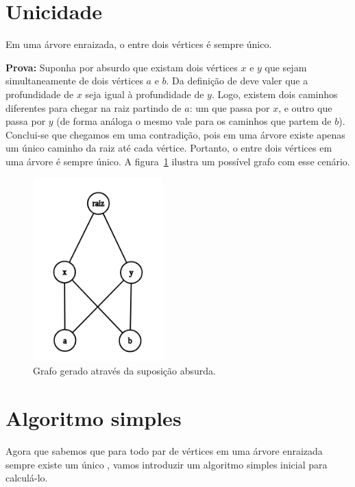 \section{Unicidade}

\begin{definition}
\label{unicidade}
Em uma árvore enraizada, o \LCA entre dois vértices é sempre único.
\end{definition}

\noindent
\textbf{Prova: }
Suponha por absurdo que existam dois vértices $x$ e $y$ que sejam simultaneamente \LCA de dois vértices $a$ e $b$. Da definição de \LCA deve valer que a profundidade de $x$ seja igual à profundidade de $y$. Logo, existem dois caminhos diferentes para chegar na raiz partindo de $a$: um que passa por $x$, e outro que passa por $y$ (de forma análoga o mesmo vale para os caminhos que partem de $b$). Conclui-se que chegamos em uma contradição, pois em uma árvore existe apenas um único caminho da raiz até cada vértice. Portanto, o \LCA entre dois vértices em uma árvore é sempre único. A figura~\ref{fig:grafo-nao-arvore} ilustra um possível grafo com esse cenário.

\begin{figure}[htb]
\begin{center}
\includegraphics[width=5cm]{images/graph2}
\end{center}
\caption{\label{fig:grafo-nao-arvore}Grafo gerado através da suposição absurda.}
\end{figure}



\section{Algoritmo simples}

Agora que sabemos que para todo par de vértices em uma árvore enraizada sempre existe um único \LCA, vamos introduzir um algoritmo simples inicial para calculá-lo.

